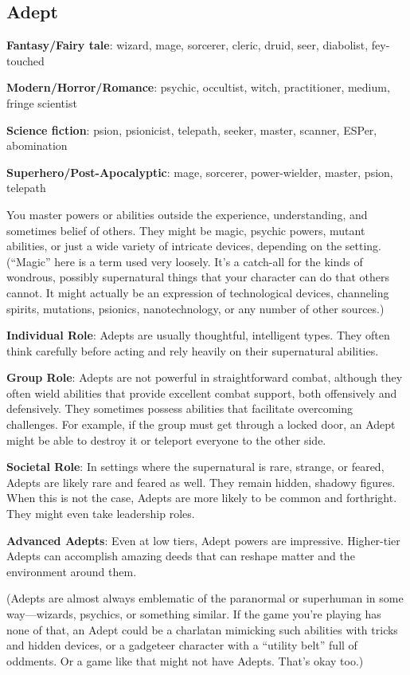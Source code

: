 \begin{multicols}{2}
\section{Adept}
\textbf{Fantasy/Fairy tale}: wizard, mage, sorcerer, cleric, druid, seer, diabolist, fey-touched

\textbf{Modern/Horror/Romance}: psychic, occultist, witch, practitioner, medium, fringe scientist

\textbf{Science fiction}: psion, psionicist, telepath, seeker, master, scanner, ESPer, abomination

\textbf{Superhero/Post-Apocalyptic}: mage, sorcerer, power-wielder, master, psion, telepath

You master powers or abilities outside the experience, understanding, and sometimes belief of others. They might be magic, psychic powers, mutant abilities, or just a wide variety of intricate devices, depending on the setting. (“Magic” here is a term used very loosely. It’s a catch-all for the kinds of wondrous, possibly supernatural things that your character can do that others cannot. It might actually be an expression of technological devices, channeling spirits, mutations, psionics, nanotechnology, or any number of other sources.)

\textbf{Individual Role}: Adepts are usually thoughtful, intelligent types. They often think carefully before acting and rely heavily on their supernatural abilities.

\textbf{Group Role}: Adepts are not powerful in straightforward combat, although they often wield abilities that provide excellent combat support, both offensively and defensively. They sometimes possess abilities that facilitate overcoming challenges. For example, if the group must get through a locked door, an Adept might be able to destroy it or teleport everyone to the other side. 

\textbf{Societal Role}: In settings where the supernatural is rare, strange, or feared, Adepts are likely rare and feared as well. They remain hidden, shadowy figures. When this is not the case, Adepts are more likely to be common and forthright. They might even take leadership roles.

\textbf{Advanced Adepts}: Even at low tiers, Adept powers are impressive. Higher-tier Adepts can accomplish amazing deeds that can reshape matter and the environment around them.

(Adepts are almost always emblematic of the paranormal or superhuman in some way—wizards, psychics, or something similar. If the game you’re playing has none of that, an Adept could be a charlatan mimicking such abilities with tricks and hidden devices, or a gadgeteer character with a “utility belt” full of oddments. Or a game like that might not have Adepts. That’s okay too.)


\end{multicols}
